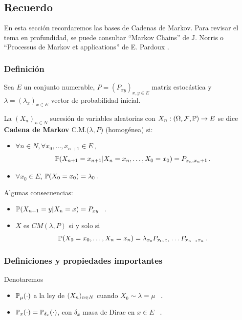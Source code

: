 \subsection{Recuerdo}
En esta sección recordaremos las bases de Cadenas de Markov. Para revisar el tema en profundidad, se puede consultar  ``Markov Chains'' de J. Norris \cite{norris} o ``Processus de Markov et applications'' de E. Pardoux \cite{pardoux}.
\subsubsection{Definición}
\begin{definition}
Sea $E$ un conjunto numerable, $P=(P_{xy})_{x,y\in E}$ matriz estocástica y $\lambda=(\lambda_x)_{x\in E}$ vector de probabilidad inicial.

La $(X_n)_{n\in N}$ sucesión de variables aleatorias con $X_n:\edp \to E$ se dice \textbf{Cadena de Markov} C.M.($\lambda,P$) (homog\'enea) si:
\begin{itemize}
    \item $\forall n \in N, \forall x_0,\dots,x_{n+1}\in E \, ,$
    $$ \P(X_{n+1}=x_{n+1}|X_n=x_n,\dots,X_0=x_0) = P_{x_n,x_n+1} \, .$$
    \item $\forall x_0\in E$, $\P(X_0=x_0)=\lambda_0 \, .$
\end{itemize}
\end{definition}

\begin{property}
Algunas consecuencias:
\begin{itemize}
    \item $\P(X_{n+1}=y|X_n=x) = P_{xy}$ \, .
    \item $X$ es $CM(\lambda,P)$ si y solo si $$\P(X_0=x_0,\dots,X_n=x_n)=\lambda_{x_0}P_{x_0,x_1}\dots P_{x_{n-1}x_n}\, .$$
\end{itemize}
\end{property}

\subsubsection{Definiciones y propiedades importantes}
\begin{notation}
Denotaremos
\begin{itemize}
    \item $\P_\mu(\cdot)$ a la ley de $\xcm$ cuando $X_0\sim\lambda=\mu$ \, .
    \item $\P_x(\cdot)=\P_{\delta_x}(\cdot)$, con $\delta_x$ masa de Dirac en $x\in E$ \, .
\end{itemize}
\end{notation}

